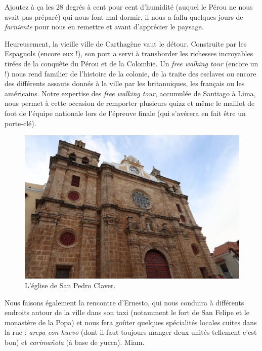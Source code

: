 Ajoutez à ça les 28 degrés à cent pour cent d'humidité (auquel le Pérou
ne nous avait pas préparé) qui nous font mal dormir, il nous a fallu
quelques jours de \emph{farniente} pour nous en remettre et avant
d'apprécier le paysage.

Heureusement, la vieille ville de Carthagène vaut le détour. Construite
par les Espagnols (encore eux !), son port a servi à transborder les
richesses incroyables tirées de la conquête du Pérou et de la Colombie.
Un \emph{free walking tour} (encore un !) nous rend familier de
l'histoire de la colonie, de la traite des esclaves ou encore des
différents assauts donnés à la ville par les britanniques, les français
ou les américains. Notre expertise des \emph{free walking tour},
accumulée de Santiago à Lima, nous permet à cette occasion de remporter
plusieurs quizz et même le maillot de foot de l'équipe nationale lors de
l'épreuve finale (qui s'avérera en fait être un porte-clé).

\begin{figure}
\centering
\includegraphics{images/20180917_sanpedro.JPG}
\caption{L'église de San Pedro Claver.}
\end{figure}

Nous faisons également la rencontre d'Ernesto, qui nous conduira à
différents endroits autour de la ville dans son taxi (notamment le fort
de San Felipe et le monastère de la Popa) et nous fera goûter quelques
spécialités locales cuites dans la rue : \emph{arepa con huevo} (dont il
faut toujours manger deux unités tellement c'est bon) et
\emph{carimañola} (à base de yucca). Miam.


